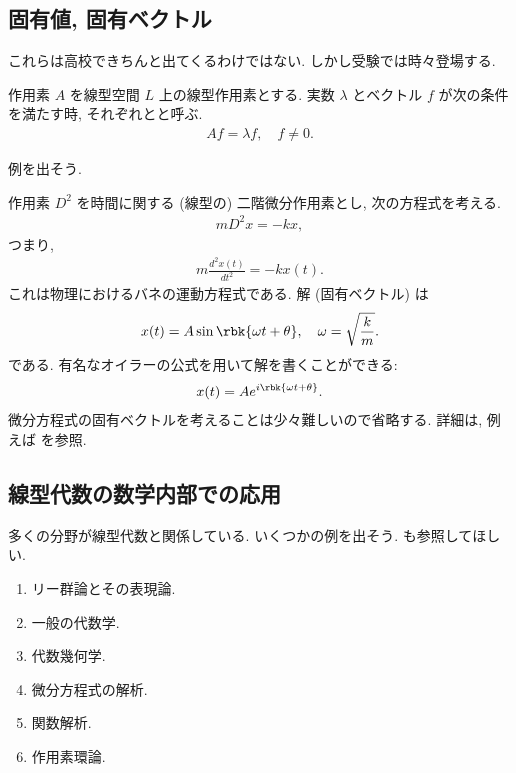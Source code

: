 \documentclass[openany, a4paper, oneside]{jsbook}
\begin{document}
\subsection{固有値, 固有ベクトル}

これらは高校できちんと出てくるわけではない.
しかし受験では時々登場する.
\begin{defn}
 作用素 $A$ を線型空間 $L$ 上の線型作用素とする.
 実数 $\lambda$ とベクトル $f$ が次の条件を満たす時, それぞれとと呼ぶ.
 \begin{align}
  A f = \lambda f, \quad
  f \neq 0.
 \end{align}
\end{defn}
例を出そう.
\begin{ex}
 作用素 $D^2$ を時間に関する (線型の) 二階微分作用素とし, 次の方程式を考える.
  \begin{align}
   m D^2 x
   =
   -k x,
  \end{align}
 つまり,
  \begin{align}
   m \frac{d^2 x (t)}{dt^2}
   =
   -k x(t).
  \end{align}
 これは物理におけるバネの運動方程式である.
 解 (固有ベクトル) は
  \begin{align}
   x(t)
   =
   A \sin \rbk{\omega t + \theta}, \quad
   \omega
   =
   \sqrt{\frac{k}{m}}.
  \end{align}
 である.
 有名なオイラーの公式を用いて解を書くことができる:
  \begin{align}
   x(t)
   =
   A e^{i \rbk{\omega t + \theta}}.
  \end{align}
 微分方程式の固有ベクトルを考えることは少々難しいので省略する.
 詳細は, 例えば \cite{HaimBrezis1, HaimBrezis2} を参照.
\end{ex}
\subsection{線型代数の数学内部での応用}

多くの分野が線型代数と関係している.
いくつかの例を出そう.
\cite{phasetr2} も参照してほしい.
\begin{enumerate}
\item リー群論とその表現論.
\item 一般の代数学.
\item 代数幾何学.
\item 微分方程式の解析.
\item 関数解析.
\item 作用素環論.
\end{enumerate}
\end{document}

